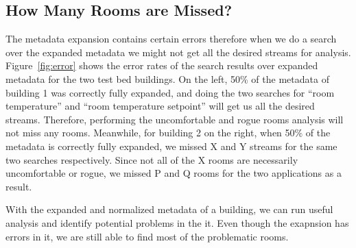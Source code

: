 
\subsection{How Many Rooms are Missed?}
The metadata expansion contains certain errors therefore when we do a search over the expanded metadata we might not get all the desired streams for analysis. Figure~\ref{fig:error} shows the error rates of the search results over expanded metadata for the two test bed buildings. On the left, 50\% of the metadata of building 1 was correctly fully expanded, and doing the two searches for ``room temperature'' and ``room temperature setpoint'' will get us all the desired streams. Therefore, performing the uncomfortable and rogue rooms analysis will not miss any rooms. Meanwhile, for building 2 on the right, when 50\% of the metadata is correctly fully expanded, we missed X and Y streams for the same two searches respectively. Since not all of the X rooms are necessarily uncomfortable or rogue, we missed P and Q rooms for the two applications as a result.

With the expanded and normalized metadata of a building, we can run useful analysis and identify potential problems in the it. Even though the exapnsion has errors in it, we are still able to find most of the problematic rooms.

